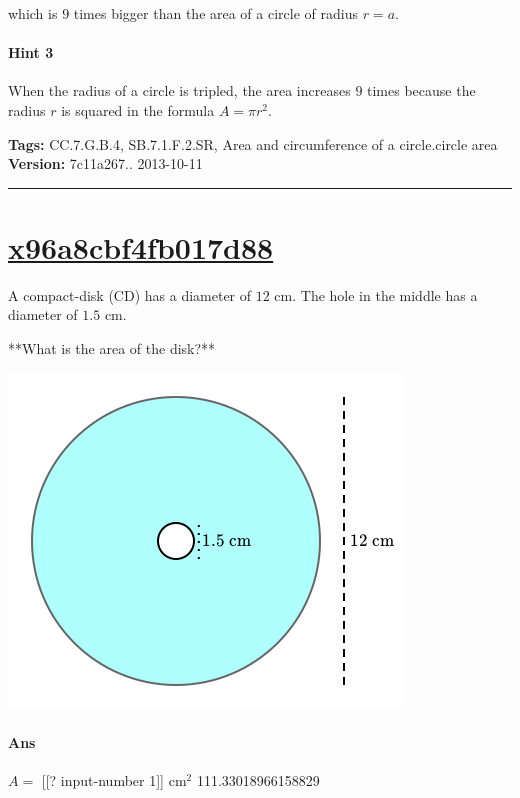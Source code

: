 \documentclass[twocolumn,10pt]{article}
\def\shrinkfactor{0.45}
\begin{document}
which is $9$ times bigger than the area of a circle of radius $r=a$. 

\paragraph{Hint 3}When the radius of a circle is tripled, the area increases $9$ times because the radius $r$ is squared in the formula $A=\pi r^2$. 



\medskip
\noindent
\textbf{Tags:} {\footnotesize CC.7.G.B.4, SB.7.1.F.2.SR, Area and circumference of a circle.circle area}\\
\textbf{Version:} 7c11a267.. 2013-10-11
\smallskip\hrule





\section{\href{https://www.khanacademy.org/devadmin/content/items/x96a8cbf4fb017d88}{x96a8cbf4fb017d88}}

\noindent
A compact-disk (CD) has a diameter of $12\text{ cm}$. The hole in the middle has a diameter of $1.5\text{ cm}$. 

**What is the area of the disk?**  


\includegraphics[scale=\shrinkfactor]{figures/fea5db7586f0e819785c674bb2fc6212dda1ce88.png}

\paragraph{Ans} $A =$ [[? input-number 1]] $\text{cm}^2$  111.33018966158829
\end{document}
